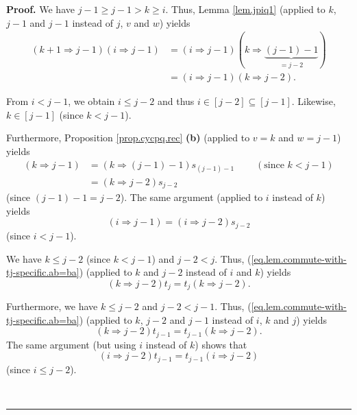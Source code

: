 \documentclass[numbers=enddot,12pt,final,onecolumn,notitlepage]{scrartcl}%
\theoremstyle{definition}
\newenvironment{proof}[1][Proof]{\noindent\textbf{#1.} }{\ \rule{0.5em}{0.5em}}
\begin{document}
\begin{proof}
We have $j-1\geq j-1>k\geq i$. Thus, Lemma \ref{lem.jpiq1} (applied to $k$,
$j-1$ and $j-1$ instead of $j$, $v$ and $w$) yields%
\begin{align}
\left(  k+1\Longrightarrow j-1\right)  \left(  i\Longrightarrow j-1\right)
&  =\left(  i\Longrightarrow j-1\right)  \left(  k\Longrightarrow
\underbrace{\left(  j-1\right)  -1}_{=j-2}\right)  \nonumber\\
&  =\left(  i\Longrightarrow j-1\right)  \left(  k\Longrightarrow j-2\right)
.\label{pf.lem.move-mu.1}%
\end{align}


From $i<j-1$, we obtain $i\leq j-2$ and thus $i\in\left[  j-2\right]
\subseteq\left[  j-1\right]  $. Likewise, $k\in\left[  j-1\right]  $ (since
$k<j-1$).

Furthermore, Proposition \ref{prop.cycpq.rec} \textbf{(b)} (applied to $v=k$
and $w=j-1$) yields%
\begin{align}
\left(  k\Longrightarrow j-1\right)   &  =\left(  k\Longrightarrow\left(
j-1\right)  -1\right)  s_{\left(  j-1\right)  -1}\ \ \ \ \ \ \ \ \ \ \left(
\text{since }k<j-1\right)  \nonumber\\
&  =\left(  k\Longrightarrow j-2\right)  s_{j-2}\label{pf.lem.move-mu.2k}%
\end{align}
(since $\left(  j-1\right)  -1=j-2$). The same argument (applied to $i$
instead of $k$) yields%
\begin{equation}
\left(  i\Longrightarrow j-1\right)  =\left(  i\Longrightarrow j-2\right)
s_{j-2}\label{pf.lem.move-mu.2i}%
\end{equation}
(since $i<j-1$).

We have $k\leq j-2$ (since $k<j-1$) and $j-2<j$. Thus,
(\ref{eq.lem.commute-with-tj-specific.ab=ba}) (applied to $k$ and $j-2$
instead of $i$ and $k$) yields%
\begin{equation}
\left(  k\Longrightarrow j-2\right)  t_{j}=t_{j}\left(  k\Longrightarrow
j-2\right)  .\label{pf.lem.move-mu.3j}%
\end{equation}


Furthermore, we have $k\leq j-2$ and $j-2<j-1$. Thus,
(\ref{eq.lem.commute-with-tj-specific.ab=ba}) (applied to $k$, $j-2$ and $j-1$
instead of $i$, $k$ and $j$) yields
\begin{equation}
\left(  k\Longrightarrow j-2\right)  t_{j-1}=t_{j-1}\left(  k\Longrightarrow
j-2\right)  .\label{pf.lem.move-mu.3j-1}%
\end{equation}
The same argument (but using $i$ instead of $k$) shows that%
\begin{equation}
\left(  i\Longrightarrow j-2\right)  t_{j-1}=t_{j-1}\left(  i\Longrightarrow
j-2\right)  \label{pf.lem.move-mu.3j-1i}%
\end{equation}
(since $i\leq j-2$).


\end{proof}
\end{document}

